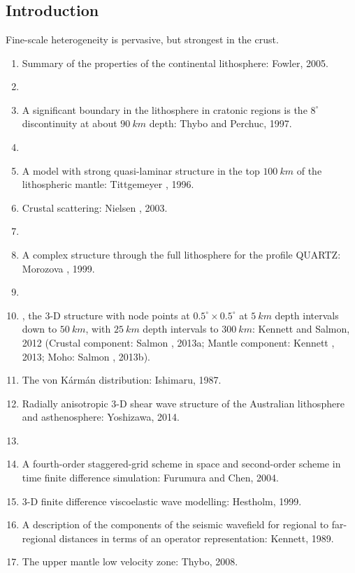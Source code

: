 \renewcommand{\pmk}{Kennett\_2016\_GGG\_Multiscale seismic heterogeneity}
\renewcommand{\prf}{Others/\pmk.pdf}
\renewcommand{\pti}{Multiscale seismic heterogeneity in
the continental lithosphere}
\renewcommand{\pay}{B. L. N. Kennett and T. Furumura, 2016}
\renewcommand{\pjo}{Geochem. Geophys. Geosyst.}
\renewcommand{\pda}{2019/6/2 Sun.}

\section{\pinfo}
\subsection{Introduction}
Fine-scale heterogeneity is pervasive, but strongest in the crust.

\begin{enumerate}[\hspace{10mm}*]
  \item Summary of the properties of the continental lithosphere: Fowler, 2005.
  \item \sline
  \item A significant boundary in the lithosphere in cratonic regions is
    the $8^\circ$ discontinuity at about $90~km$ depth: Thybo and Perchuc, 1997.
  \item \sline
  \item A model with strong quasi-laminar structure in the top $100~km$ of
    the lithospheric mantle: Tittgemeyer \etal, 1996.
  \item Crustal scattering: Nielsen \etal, 2003.
  \item \sline
  \item A complex structure through the full lithosphere
    for the profile QUARTZ: Morozova \etal, 1999.
  \item \sline
  \item {},
    the 3-D structure with node points at $0.5^\circ\times 0.5^\circ$
    at $5~km$ depth intervals down to $50~km$,
    with $25~km$ depth intervals to $300~km$:
    Kennett and Salmon, 2012 (Crustal component: Salmon \etal, 2013a;
    Mantle component: Kennett \etal, 2013; Moho: Salmon \etal, 2013b).
  \item The von K\'arm\'an distribution: Ishimaru, 1987.
  \item Radially anisotropic 3-D shear wave structure of the Australian
    lithosphere and asthenosphere: Yoshizawa, 2014.
  \item \sline
  \item A fourth-order staggered-grid scheme in space and second-order scheme
    in time finite difference simulation: Furumura and Chen, 2004.
  \item 3-D finite difference viscoelastic wave modelling: Hestholm, 1999.
  \item A description of the components of the seismic wavefield for regional
    to far-regional distances in terms of an operator representation:
    Kennett, 1989.
  \item The upper mantle low velocity zone: Thybo, 2008.
\end{enumerate}

